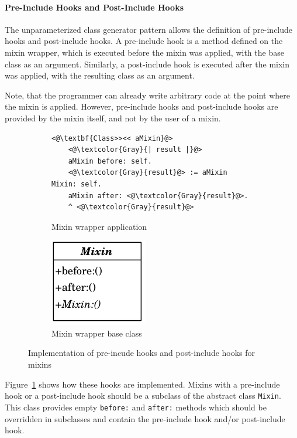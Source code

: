 \paragraph{Pre-Include Hooks and Post-Include Hooks}
The unparameterized class generator pattern allows the definition of pre-include hooks and post-include hooks. A pre-include hook is a method defined on the mixin wrapper, which is executed before the mixin was applied, with the base class as an argument. Similarly, a post-include hook is executed after the mixin was applied, with the resulting class as an argument. 

Note, that the programmer can already write arbitrary code at the point where the mixin is applied. However, pre-include hooks and post-include hooks are provided by the mixin itself, and not by the user of a mixin.

\begin{figure}[!htp]
\centering
\begin{subfigure}[b]{0.45\textwidth}
\begin{lstlisting}
<@\textbf{Class>><< aMixin}@>
    <@\textcolor{Gray}{| result |}@>
    aMixin before: self.
    <@\textcolor{Gray}{result}@> := aMixin Mixin: self.
    aMixin after: <@\textcolor{Gray}{result}@>.
    ^ <@\textcolor{Gray}{result}@>
\end{lstlisting}
\caption{Mixin wrapper application}
\end{subfigure}
\qquad
\begin{subfigure}[b]{0.45\textwidth}
	\centering
	\includegraphics[scale=1]{abstract_mixin_classgen.pdf}
	\caption{Mixin wrapper base class}
\end{subfigure}
\caption{Implementation of pre-incude hooks and post-include hooks for mixins}
\label{fig:usecase_prepostincl}
\end{figure}

Figure~\ref{fig:usecase_prepostincl} shows how these hooks are implemented. Mixins with a pre-include hook or a post-include hook should be a subclass of the abstract class \texttt{Mixin}. This class provides empty \texttt{before:} and \texttt{after:} methods which should be overridden in subclasses and contain the pre-include hook and/or post-include hook.

